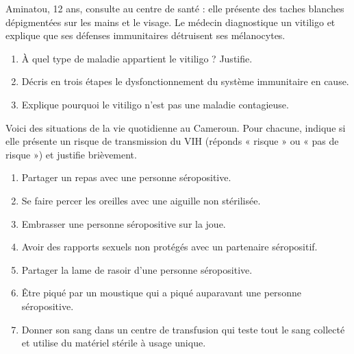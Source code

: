 \documentclass[11pt]{article}
\newcounter{popsec}
\newcounter{popsub}
\newcommand{\courssub}[1]{%
  \stepcounter{popsub}%
  \par\vspace{9pt}\noindent{\popxbold\fontsize{11.5}{13}\selectfont\color{popink}{\color{poporange}\thepopsec.\thepopsub}\hspace{6pt}#1}\par\nopagebreak\vspace{4pt}
}
\begin{document}
\courssub{Je m'entraîne}

\begin{exercice}
Aminatou, 12 ans, consulte au centre de santé : elle présente des taches blanches dépigmentées sur les mains et le visage. Le médecin diagnostique un vitiligo et explique que ses défenses immunitaires détruisent ses mélanocytes.
\begin{enumerate}
\item À quel type de maladie appartient le vitiligo ? Justifie.
\item Décris en trois étapes le dysfonctionnement du système immunitaire en cause.
\item Explique pourquoi le vitiligo n'est pas une maladie contagieuse.
\end{enumerate}
\end{exercice}

\begin{exercice}
Voici des situations de la vie quotidienne au Cameroun. Pour chacune, indique si elle présente un risque de transmission du VIH (réponds « risque » ou « pas de risque ») et justifie brièvement.
\begin{enumerate}
\item Partager un repas avec une personne séropositive.
\item Se faire percer les oreilles avec une aiguille non stérilisée.
\item Embrasser une personne séropositive sur la joue.
\item Avoir des rapports sexuels non protégés avec un partenaire séropositif.
\item Partager la lame de rasoir d'une personne séropositive.
\item Être piqué par un moustique qui a piqué auparavant une personne séropositive.
\item Donner son sang dans un centre de transfusion qui teste tout le sang collecté et utilise du matériel stérile à usage unique.
\end{enumerate}
\end{exercice}
\end{document}
